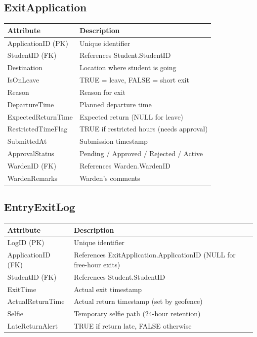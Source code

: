 \documentclass[12pt,a4paper]{article}
\begin{document}
\subsection{ExitApplication}
\begin{longtable}{|p{4cm}|p{8cm}|}
\hline
\textbf{Attribute} & \textbf{Description} \\
\hline
ApplicationID (PK) & Unique identifier \\
StudentID (FK) & References Student.StudentID \\
Destination & Location where student is going \\
IsOnLeave & TRUE = leave, FALSE = short exit \\
Reason & Reason for exit \\
DepartureTime & Planned departure time \\
ExpectedReturnTime & Expected return (NULL for leave) \\
RestrictedTimeFlag & TRUE if restricted hours (needs approval) \\
SubmittedAt & Submission timestamp \\
ApprovalStatus & Pending / Approved / Rejected / Active \\
WardenID (FK) & References Warden.WardenID \\
WardenRemarks & Warden's comments \\
\hline
\end{longtable}

\subsection{EntryExitLog}
\begin{longtable}{|p{4cm}|p{8cm}|}
\hline
\textbf{Attribute} & \textbf{Description} \\
\hline
LogID (PK) & Unique identifier \\
ApplicationID (FK) & References ExitApplication.ApplicationID (NULL for free-hour exits) \\
StudentID (FK) & References Student.StudentID \\
ExitTime & Actual exit timestamp \\
ActualReturnTime & Actual return timestamp (set by geofence) \\
Selfie & Temporary selfie path (24-hour retention) \\
LateReturnAlert & TRUE if return late, FALSE otherwise \\
\hline
\end{longtable}
\end{document}
